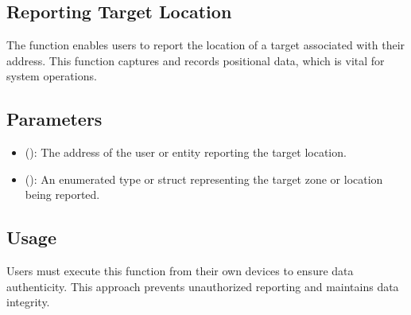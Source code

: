 \documentclass[a4paper,10pt,english]{sphinxmanual}
\begin{document}
\subsection{Reporting Target Location}
\label{\detokenize{docs_consensus_mechanism_contract:reporting-target-location}}
\sphinxAtStartPar
The  function enables users to report the location of a target associated with their address. This function captures and records positional data, which is vital for system operations.

\begin{sphinxVerbatim}[commandchars=\\\{\}]
\end{sphinxVerbatim}


\subsection{Parameters}
\label{\detokenize{docs_consensus_mechanism_contract:id1}}\begin{itemize}
\item {} 
\sphinxAtStartPar
{} ():
The address of the user or entity reporting the target location.

\item {} 
\sphinxAtStartPar
{} ():
An enumerated type or struct representing the target zone or location being reported.

\end{itemize}


\subsection{Usage}
\label{\detokenize{docs_consensus_mechanism_contract:id2}}
\sphinxAtStartPar
Users must execute this function from their own devices to ensure data authenticity. This approach prevents unauthorized reporting and maintains data integrity.
\end{document}
